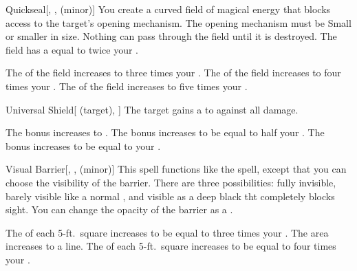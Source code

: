 \lowercase{\hypertarget{spell:Quickseal}{}}\label{spell:Quickseal}
\begin{freeability}[Rank 2]{\hypertarget{spell:Quickseal}{Quickseal}}[, ,  (minor)]
You create a curved field of magical energy that blocks access to the target's opening mechanism.
The opening mechanism must be Small or smaller in size.
Nothing can pass through the field until it is destroyed.
The field has a  equal to twice your .

\rankline
{} The  of the field increases to three times your .
 The  of the field increases to four times your .
 The  of the field increases to five times your .
\end{freeability}
\vspace{0.25em}



\lowercase{\hypertarget{spell:Universal Shield}{}}\label{spell:Universal Shield}
\begin{attuneability}[Rank 2]{\hypertarget{spell:Universal Shield}{Universal Shield}}[ (target), ]
The target gains a   to  against all damage.

\rankline
{} The bonus increases to .
 The bonus increases to be equal to half your .
 The bonus increases to be equal to your .
\end{attuneability}
\vspace{0.25em}



\lowercase{\hypertarget{spell:Visual Barrier}{}}\label{spell:Visual Barrier}
\begin{freeability}[Rank 2]{\hypertarget{spell:Visual Barrier}{Visual Barrier}}[, ,  (minor)]
\targetrule
This spell functions like the  spell, except that you can choose the visibility of the barrier.
There are three possibilities: fully invisible, barely visible like a normal , and visible as a deep black tht completely blocks sight.
You can change the opacity of the barrier as a .

\rankline
{} The  of each 5-ft.\ square increases to be equal to three times your .
 The area increases to a \arealarge line.
 The  of each 5-ft.\ square increases to be equal to four times your .
\end{freeability}
\vspace{0.25em}



